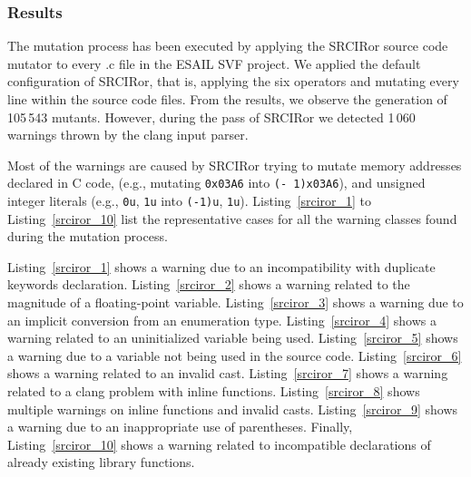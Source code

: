 
\subsubsection{Results}

The mutation process has been executed by applying the SRCIRor source code mutator to every .c file in the ESAIL SVF project. We applied the default configuration of SRCIRor, that is, applying the six operators and mutating every line within the source code files.
From the results, we observe the generation of 105\,543 mutants. However, during the pass of SRCIRor we detected 1\,060 warnings thrown by the clang input parser.

Most of the warnings are caused by SRCIRor trying to mutate memory addresses declared in C code, (e.g., mutating \texttt{0x03A6} into \texttt{(- 1)x03A6}), and unsigned integer literals (e.g., \texttt{0u}, \texttt{1u} into \texttt{(-1)u}, \texttt{1u}).
Listing~\ref{srciror_1} to Listing~\ref{srciror_10} list the representative cases for all the warning classes found during the mutation process. 

Listing~\ref{srciror_1} shows a warning due to an incompatibility with duplicate keywords declaration. 
Listing~\ref{srciror_2} shows a warning related to the magnitude of a floating-point variable. 
Listing~\ref{srciror_3} shows a warning due to an implicit conversion from an enumeration type. 
Listing~\ref{srciror_4} shows a warning related to an uninitialized variable being used. 
Listing~\ref{srciror_5} shows a warning due to a variable not being used in the source code. 
Listing~\ref{srciror_6} shows a warning related to an invalid cast. 
Listing~\ref{srciror_7} shows a warning related to a clang problem with inline functions. 
Listing~\ref{srciror_8} shows multiple warnings on inline functions and invalid casts.
Listing~\ref{srciror_9} shows a warning due to an inappropriate use of parentheses. Finally, Listing~\ref{srciror_10} shows a warning related to incompatible declarations of already existing library functions. 

